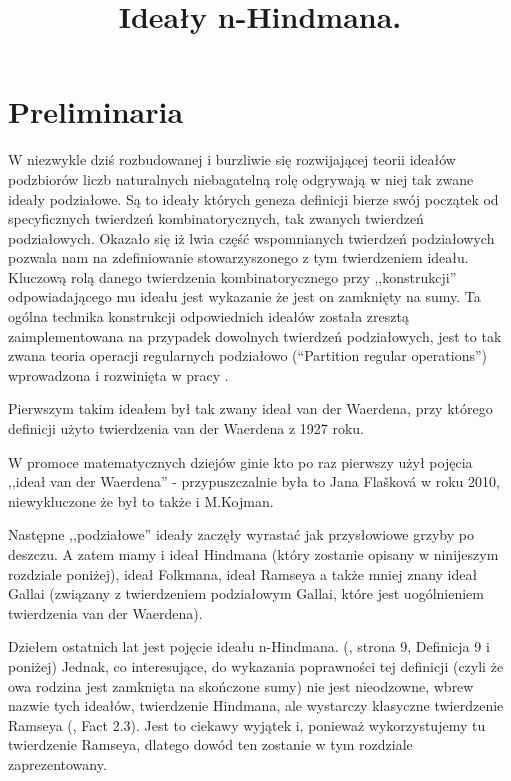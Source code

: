 \documentclass[12pt]{amsart}
\theoremstyle{plain}
\theoremstyle{definition}
\theoremstyle{remark}
\begin{document}
\title{
Ideały n-Hindmana.
}
\maketitle

\section{Preliminaria}

  W niezwykle dziś rozbudowanej i burzliwie się
rozwijającej teorii ideałów podzbiorów liczb naturalnych
niebagatelną rolę odgrywają w niej tak zwane ideały podziałowe.
Są to ideały których geneza definicji bierze swój początek
od specyficznych twierdzeń kombinatorycznych, tak zwanych twierdzeń podziałowych.
  Okazało się iż lwia część wspomnianych twierdzeń podziałowych pozwala nam na zdefiniowanie
stowarzyszonego z tym twierdzeniem ideału. Kluczową rolą danego twierdzenia
kombinatorycznego przy ,,konstrukcji'' odpowiadającego mu ideału
jest wykazanie że jest on zamknięty na sumy.
Ta ogólna technika konstrukcji odpowiednich ideałów została
zresztą zaimplementowana na przypadek dowolnych twierdzeń podziałowych,
jest to tak zwana teoria operacji regularnych podziałowo
(``Partition regular operations'')
wprowadzona i rozwinięta w pracy \cite{FilipowKowitzKwela2026}.


  Pierwszym takim ideałem był tak zwany ideał van der Waerdena,
przy którego definicji użyto twierdzenia van der Waerdena z 1927 roku.


  W promoce matematycznych dziejów ginie kto po raz pierwszy
użył pojęcia ,,ideał van der Waerdena'' - przypuszczalnie
była to Jana Fla{\v{s}}kov\'a w roku 2010, niewykluczone że
był to także i M.Kojman.

Następne ,,podziałowe'' ideały zaczęły wyrastać jak przysłowiowe
grzyby po deszczu. A zatem mamy i ideał Hindmana (który zostanie opisany
w ninijeszym rozdziale poniżej), ideał Folkmana, ideał Ramseya a także
mniej znany ideał Gallai (związany z twierdzeniem podziałowym Gallai, które
jest uogólnieniem twierdzenia van der Waerdena).

Dziełem ostatnich lat jest pojęcie ideału n-Hindmana.
(\cite{MazurkiewiczZeberski2026}, strona 9, Definicja 9 i poniżej)
Jednak, co interesujące, do wykazania poprawności tej definicji
(czyli że owa rodzina jest zamknięta na skończone sumy)
nie jest nieodzowne, wbrew nazwie tych ideałów, twierdzenie
Hindmana, ale wystarczy klasyczne twierdzenie Ramseya
(\cite{MazurkiewiczZeberski2026}, Fact 2.3).
Jest to ciekawy wyjątek i, ponieważ wykorzystujemy tu twierdzenie Ramseya,
dlatego dowód ten zostanie w tym rozdziale zaprezentowany.
\end{document}
